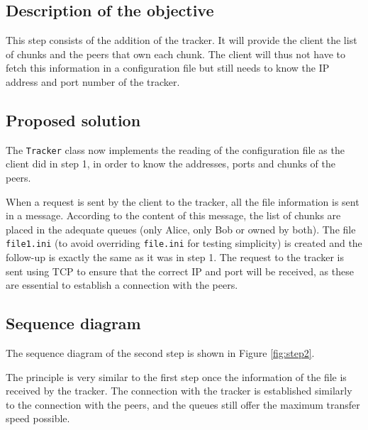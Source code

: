 \subsection{Description of the objective}

This step consists of the addition of the tracker. It will provide the client the list of chunks and the peers that own each chunk. The client will thus not have to fetch this information in a configuration file but still needs to know the IP address and port number of the tracker.

\subsection{Proposed solution}

The \texttt{Tracker} class now implements the reading of the configuration file as the client did in step 1, in order to know the addresses, ports and chunks of the peers.

When a request is sent by the client to the tracker, all the file information is sent in a message. According to the content of this message, the list of chunks are placed in the adequate queues (only Alice, only Bob or owned by both). The file {\tt file1.ini} (to avoid overriding {\tt file.ini} for testing simplicity) is created and the follow-up is exactly the same as it was in step 1. The request to the tracker is sent using TCP to ensure that the correct IP and port will be received, as these are essential to establish a connection with the peers.

\subsection{Sequence diagram}

The sequence diagram of the second step is shown in Figure \ref{fig:step2}.

The principle is very similar to the first step once the information of the file is received by the tracker. The connection with the tracker is established similarly to the connection with the peers, and the queues still offer the maximum transfer speed possible.

